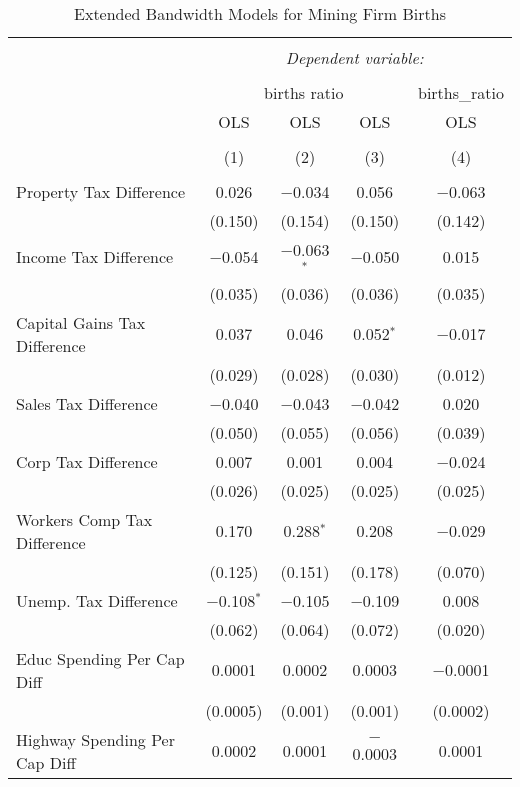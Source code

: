 
\begin{table}[!htbp] \centering 
  \caption{Extended Bandwidth Models for  Mining Firm Births} 
  \label{21eb} 
\begin{tabular}{@{\extracolsep{5pt}}lcccc} 
\\[-1.8ex]\hline 
\hline \\[-1.8ex] 
 & \multicolumn{4}{c}{\textit{Dependent variable:}} \\ 
\cline{2-5} 
\\[-1.8ex] & \multicolumn{3}{c}{births ratio} & births\_ratio \\ 
 & OLS & OLS & OLS & OLS \\ 
\\[-1.8ex] & (1) & (2) & (3) & (4)\\ 
\hline \\[-1.8ex] 
 Property Tax Difference & 0.026 & $-$0.034 & 0.056 & $-$0.063 \\ 
  & (0.150) & (0.154) & (0.150) & (0.142) \\ 
  Income Tax Difference & $-$0.054 & $-$0.063$^{*}$ & $-$0.050 & 0.015 \\ 
  & (0.035) & (0.036) & (0.036) & (0.035) \\ 
  Capital Gains Tax Difference & 0.037 & 0.046 & 0.052$^{*}$ & $-$0.017 \\ 
  & (0.029) & (0.028) & (0.030) & (0.012) \\ 
  Sales Tax Difference & $-$0.040 & $-$0.043 & $-$0.042 & 0.020 \\ 
  & (0.050) & (0.055) & (0.056) & (0.039) \\ 
  Corp Tax Difference & 0.007 & 0.001 & 0.004 & $-$0.024 \\ 
  & (0.026) & (0.025) & (0.025) & (0.025) \\ 
  Workers Comp Tax Difference & 0.170 & 0.288$^{*}$ & 0.208 & $-$0.029 \\ 
  & (0.125) & (0.151) & (0.178) & (0.070) \\ 
  Unemp. Tax Difference & $-$0.108$^{*}$ & $-$0.105 & $-$0.109 & 0.008 \\ 
  & (0.062) & (0.064) & (0.072) & (0.020) \\ 
  Educ Spending Per Cap Diff & 0.0001 & 0.0002 & 0.0003 & $-$0.0001 \\ 
  & (0.0005) & (0.001) & (0.001) & (0.0002) \\ 
  Highway Spending Per Cap Diff & 0.0002 & 0.0001 & $-$0.0003 & 0.0001 \\ 

\end{tabular}
\end{table}
